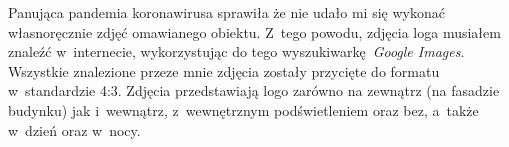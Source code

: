 Panująca pandemia koronawirusa sprawiła że nie udało mi się wykonać własnoręcznie zdjęć omawianego obiektu. Z~tego powodu, zdjęcia loga musiałem znaleźć w~internecie, wykorzystując do tego wyszukiwarkę \emph{Google Images}. Wszystkie znalezione przeze mnie zdjęcia zostały przycięte do formatu w~standardzie 4:3. Zdjęcia przedstawiają logo \bk zarówno na zewnątrz (na fasadzie budynku) jak i~wewnątrz, z~wewnętrznym podświetleniem oraz bez, a~także w~dzień oraz w~nocy.

